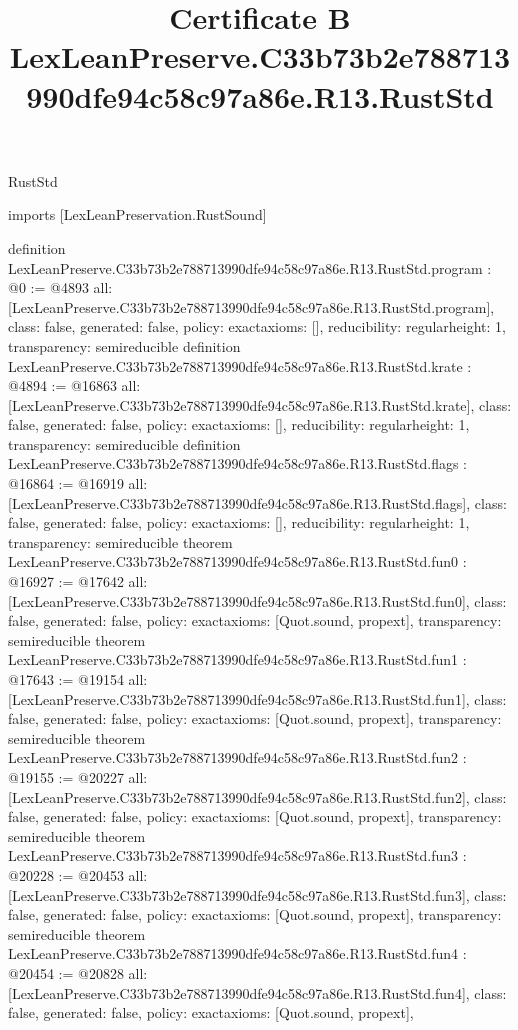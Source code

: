 \begin{lexlean}{RustStd}
\title{Certificate B LexLeanPreserve.C33b73b2e788713990dfe94c58c97a86e.R13.RustStd}
\begin{coremodule}
imports [LexLeanPreservation.RustSound]

definition LexLeanPreserve.C33b73b2e788713990dfe94c58c97a86e.R13.RustStd.program : @0 := @4893 {
  all: [LexLeanPreserve.C33b73b2e788713990dfe94c58c97a86e.R13.RustStd.program],
  class: false,
  generated: false,
  policy: exact{axioms: []},
  reducibility: regular{height: 1},
  transparency: semireducible
}
definition LexLeanPreserve.C33b73b2e788713990dfe94c58c97a86e.R13.RustStd.krate : @4894 := @16863 {
  all: [LexLeanPreserve.C33b73b2e788713990dfe94c58c97a86e.R13.RustStd.krate],
  class: false,
  generated: false,
  policy: exact{axioms: []},
  reducibility: regular{height: 1},
  transparency: semireducible
}
definition LexLeanPreserve.C33b73b2e788713990dfe94c58c97a86e.R13.RustStd.flags : @16864 := @16919 {
  all: [LexLeanPreserve.C33b73b2e788713990dfe94c58c97a86e.R13.RustStd.flags],
  class: false,
  generated: false,
  policy: exact{axioms: []},
  reducibility: regular{height: 1},
  transparency: semireducible
}
theorem LexLeanPreserve.C33b73b2e788713990dfe94c58c97a86e.R13.RustStd.fun0 : @16927 := @17642 {
  all: [LexLeanPreserve.C33b73b2e788713990dfe94c58c97a86e.R13.RustStd.fun0],
  class: false,
  generated: false,
  policy: exact{axioms: [Quot.sound, propext]},
  transparency: semireducible
}
theorem LexLeanPreserve.C33b73b2e788713990dfe94c58c97a86e.R13.RustStd.fun1 : @17643 := @19154 {
  all: [LexLeanPreserve.C33b73b2e788713990dfe94c58c97a86e.R13.RustStd.fun1],
  class: false,
  generated: false,
  policy: exact{axioms: [Quot.sound, propext]},
  transparency: semireducible
}
theorem LexLeanPreserve.C33b73b2e788713990dfe94c58c97a86e.R13.RustStd.fun2 : @19155 := @20227 {
  all: [LexLeanPreserve.C33b73b2e788713990dfe94c58c97a86e.R13.RustStd.fun2],
  class: false,
  generated: false,
  policy: exact{axioms: [Quot.sound, propext]},
  transparency: semireducible
}
theorem LexLeanPreserve.C33b73b2e788713990dfe94c58c97a86e.R13.RustStd.fun3 : @20228 := @20453 {
  all: [LexLeanPreserve.C33b73b2e788713990dfe94c58c97a86e.R13.RustStd.fun3],
  class: false,
  generated: false,
  policy: exact{axioms: [Quot.sound, propext]},
  transparency: semireducible
}
theorem LexLeanPreserve.C33b73b2e788713990dfe94c58c97a86e.R13.RustStd.fun4 : @20454 := @20828 {
  all: [LexLeanPreserve.C33b73b2e788713990dfe94c58c97a86e.R13.RustStd.fun4],
  class: false,
  generated: false,
  policy: exact{axioms: [Quot.sound, propext]},
}
\end{coremodule}
\end{lexlean}
